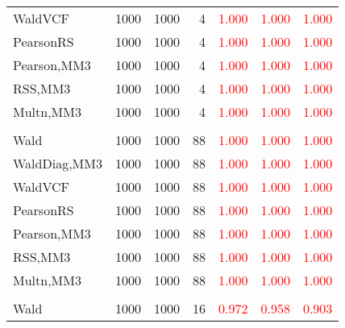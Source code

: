 \documentclass[
]{article}
\begin{document}
\begin{table}[H]
{\begin{tabular}[t]{lrrrrrr}
\hspace{1em}WaldVCF & 1000 & 1000 & 4 & \textcolor{red}{1.000} & \textcolor{red}{1.000} & \textcolor{red}{1.000}\\
\hspace{1em}PearsonRS & 1000 & 1000 & 4 & \textcolor{red}{1.000} & \textcolor{red}{1.000} & \textcolor{red}{1.000}\\
\hspace{1em}Pearson,MM3 & 1000 & 1000 & 4 & \textcolor{red}{1.000} & \textcolor{red}{1.000} & \textcolor{red}{1.000}\\
\hspace{1em}RSS,MM3 & 1000 & 1000 & 4 & \textcolor{red}{1.000} & \textcolor{red}{1.000} & \textcolor{red}{1.000}\\
\hspace{1em}Multn,MM3 & 1000 & 1000 & 4 & \textcolor{red}{1.000} & \textcolor{red}{1.000} & \textcolor{red}{1.000}\\
\addlinespace[0.3em]
\multicolumn{7}{l}{\textbf{1F 15V}}\\
\hspace{1em}Wald & 1000 & 1000 & 88 & \textcolor{red}{1.000} & \textcolor{red}{1.000} & \textcolor{red}{1.000}\\
\hspace{1em}WaldDiag,MM3 & 1000 & 1000 & 88 & \textcolor{red}{1.000} & \textcolor{red}{1.000} & \textcolor{red}{1.000}\\
\hspace{1em}WaldVCF & 1000 & 1000 & 88 & \textcolor{red}{1.000} & \textcolor{red}{1.000} & \textcolor{red}{1.000}\\
\hspace{1em}PearsonRS & 1000 & 1000 & 88 & \textcolor{red}{1.000} & \textcolor{red}{1.000} & \textcolor{red}{1.000}\\
\hspace{1em}Pearson,MM3 & 1000 & 1000 & 88 & \textcolor{red}{1.000} & \textcolor{red}{1.000} & \textcolor{red}{1.000}\\
\hspace{1em}RSS,MM3 & 1000 & 1000 & 88 & \textcolor{red}{1.000} & \textcolor{red}{1.000} & \textcolor{red}{1.000}\\
\hspace{1em}Multn,MM3 & 1000 & 1000 & 88 & \textcolor{red}{1.000} & \textcolor{red}{1.000} & \textcolor{red}{1.000}\\
\addlinespace[0.3em]
\multicolumn{7}{l}{\textbf{2F 10V}}\\
\hspace{1em}Wald & 1000 & 1000 & 16 & \textcolor{red}{0.972} & \textcolor{red}{0.958} & \textcolor{red}{0.903}\\

\end{tabular}}
\end{table}
\end{document}
